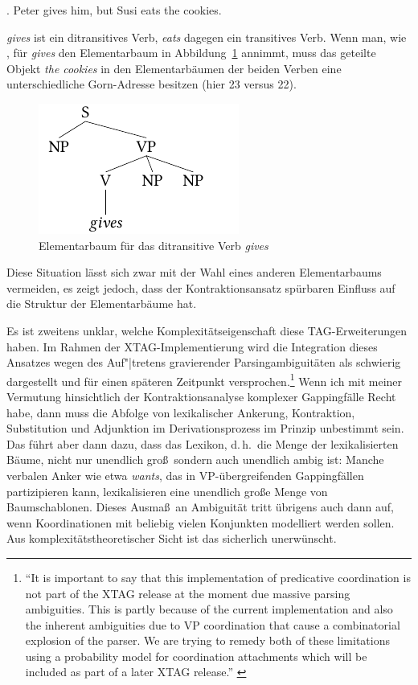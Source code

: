 \ex. \label{ex-contraction-4} Peter gives him, but Susi eats the cookies.

{\it gives} ist ein ditransitives Verb, {\it eats} dagegen ein transitives Verb. Wenn man, wie \citet[Figure~20]{Sarkar:Joshi:97}, für {\it gives} den Elementarbaum in Abbildung~\ref{fig-contraction-5} annimmt, muss das geteilte Objekt {\it the cookies} in den Elementarbäumen der beiden Verben eine unterschiedliche Gorn-Adresse besitzen (hier 23 versus 22).
\begin{figure}[t]
\centering
\includegraphics{graphics/abb810.pdf}
\caption{\label{fig-contraction-5}Elementarbaum für das ditransitive Verb {\it gives}}
\end{figure}
Diese Situation lässt sich zwar mit der Wahl eines anderen Elementarbaums vermeiden, es zeigt jedoch, dass der Kontraktionsansatz spürbaren Einfluss auf die Struktur der Elementarbäume hat. %

Es ist zweitens unklar, welche Komplexitätseigenschaft diese TAG-Erweiter\-ungen haben. Im Rahmen der XTAG-Implementierung \citep{xtag:01} wird die Integration dieses Ansatzes wegen des Auf"|tretens gravierender Parsingambiguitäten als schwierig dargestellt und für einen späteren Zeitpunkt versprochen.\footnote{"`It is important to say that this implementation of predicative coordination is not part of the XTAG release at the moment due massive parsing ambiguities. This is partly because of the current implementation and also the inherent ambiguities due to VP coordination that cause a combinatorial explosion of the parser. We are trying to remedy both of these limitations using a probability model for coordination attachments which will be included as part of a later XTAG release."' \citep[224]{xtag:01}} Wenn ich mit meiner Vermutung hinsichtlich der Kontraktionsanalyse komplexer Gappingfälle Recht habe, dann muss die Abfolge von lexikalischer Ankerung, Kontraktion, Substitution und Adjunktion im Derivationsprozess im Prinzip unbestimmt sein. Das führt aber dann dazu, dass das Lexikon, d.\,h.\ die Menge der lexikalisierten Bäume, nicht nur unendlich gro\ss\, sondern auch unendlich ambig ist: Manche verbalen Anker wie etwa {\it wants}, das in VP-übergreifenden Gappingfällen partizipieren kann, lexikalisieren eine unendlich gro\ss e Menge von Baumschablonen. Dieses Ausma\ss\ an Ambiguität tritt übrigens auch dann auf, wenn Koordinationen mit beliebig vielen Konjunkten modelliert werden sollen. Aus komplexitätstheoretischer Sicht ist das sicherlich unerwünscht.    


